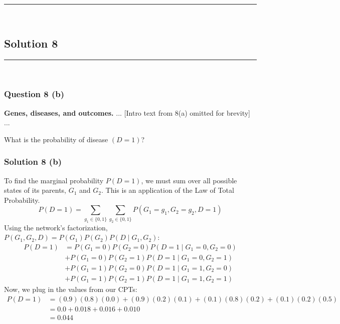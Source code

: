 \documentclass{article}
\begin{document}
\noindent\rule{\textwidth}{0.4pt}\\

\newpage

\subsection*{Solution 8}
\noindent\rule{\textwidth}{0.4pt}\\
\subsubsection*{Question 8 (b)}
\begin{flushleft}
    \textbf{Genes, diseases, and outcomes.} ... [Intro text from 8(a) omitted for brevity] ...

    What is the probability of disease $(D=1)$? 
\end{flushleft}

\subsubsection*{Solution 8 (b)}
To find the marginal probability $P(D=1)$, we must sum over all possible states of its parents, $G_1$ and $G_2$. This is an application of the Law of Total Probability.
$$ P(D=1) = \sum_{g_1 \in \{0,1\}} \sum_{g_2 \in \{0,1\}} P(G_1=g_1, G_2=g_2, D=1) $$
Using the network's factorization, $P(G_1, G_2, D) = P(G_1)P(G_2)P(D \mid G_1, G_2)$:
\begin{align*}
    P(D=1) &= P(G_1=0)P(G_2=0)P(D=1 \mid G_1=0, G_2=0) \\
           &+ P(G_1=0)P(G_2=1)P(D=1 \mid G_1=0, G_2=1) \\
           &+ P(G_1=1)P(G_2=0)P(D=1 \mid G_1=1, G_2=0) \\
           &+ P(G_1=1)P(G_2=1)P(D=1 \mid G_1=1, G_2=1)
\end{align*}
Now, we plug in the values from our CPTs:
\begin{align*}
    P(D=1) &= (0.9)(0.8)(0.0) + (0.9)(0.2)(0.1) + (0.1)(0.8)(0.2) + (0.1)(0.2)(0.5) \\
           &= 0.0 + 0.018 + 0.016 + 0.010 \\
           &= 0.044
\end{align*}
\end{document}
